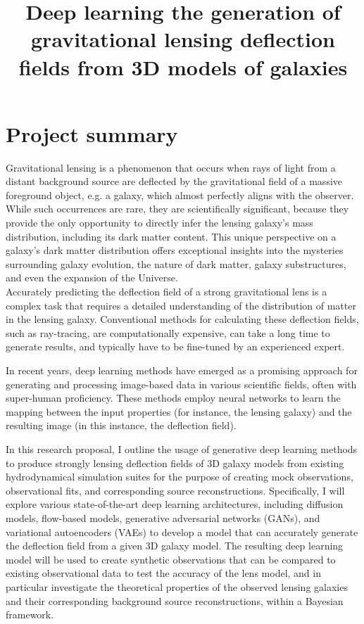 \documentclass[a4paper,10pt]{article}
\date{}
\title{Deep learning the generation of gravitational lensing deflection fields from 3D models of galaxies}
\begin{document}
\maketitle
\vspace{-0.8in}
\section*{Project summary}
\label{sec:org114fcd3}

Gravitational lensing is a phenomenon that occurs when rays of light
from a distant background source are deflected by the gravitational
field of a massive foreground object, e.g. a galaxy, which almost
perfectly aligns with the observer. While such occurrences are rare,
they are scientifically significant, because they provide the only
opportunity to directly infer the lensing galaxy's mass distribution,
including its dark matter content.  This unique perspective on a
galaxy's dark matter distribution offers exceptional insights into the
mysteries surrounding galaxy evolution, the nature of dark matter,
galaxy substructures, and even the expansion of the Universe. \\[0pt]
Accurately predicting the deflection field of a strong gravitational
lens is a complex task that requires a detailed understanding of the
distribution of matter in the lensing galaxy. Conventional methods for
calculating these deflection fields, such as ray-tracing, are
computationally expensive, can take a long time to generate results,
and typically have to be fine-tuned by an experienced expert.

In recent years, deep learning methods have emerged as a promising
approach for generating and processing image-based data in various
scientific fields, often with super-human proficiency. These methods
employ neural networks to learn the mapping between the input
properties (for instance, the lensing galaxy) and the resulting image
(in this instance, the deflection field).

In this research proposal, I outline the usage of generative deep
learning methods to produce strongly lensing deflection fields of 3D
galaxy models from existing hydrodynamical simulation suites for the
purpose of creating mock observations, observational fits, and
corresponding source reconstructions. Specifically, I will explore
various state-of-the-art deep learning architectures, including
diffusion models, flow-based models, generative adversarial networks
(GANs), and variational autoencoders (VAEs) to develop a model that
can accurately generate the deflection field from a given 3D galaxy
model. The resulting deep learning model will be used to create
synthetic observations that can be compared to existing observational
data to test the accuracy of the lens model, and in particular
investigate the theoretical properties of the observed lensing
galaxies and their corresponding background source reconstructions,
within a Bayesian framework.
\end{document}
